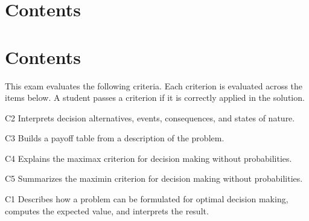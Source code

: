 


\section*{Contents}
\setcounter{tocdepth}{2}
\setcounter{secnumdepth}{1}
\section*{Contents}
\setcounter{tocdepth}{2}
\setcounter{secnumdepth}{1}
\tableofcontents
	This exam evaluates the following criteria. Each criterion is evaluated across the items below. A student passes a criterion if it is correctly applied in the solution.
	\begin{ExamCriteria}
		\item C2 Interprets decision alternatives, events, consequences, and states of nature.
		\item C3 Builds a payoff table from a description of the problem.
		\item C4 Explains the maximax criterion for decision making without probabilities.
		\item C5 Summarizes the maximin criterion for decision making without probabilities.
		\item C1 Describes how a problem can be formulated for optimal decision making, computes the expected value, and interprets the result.
	\end{ExamCriteria}
